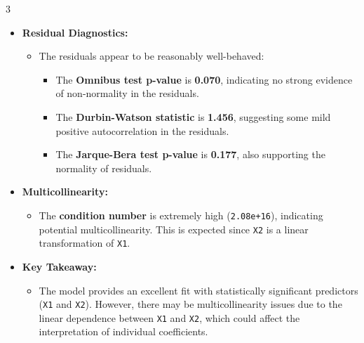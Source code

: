 \documentclass[letterpaper, 10.5pt,landscape]{article}
\begin{document}
\begin{multicols*}{3}
\begin{itemize}[leftmargin=0.4cm]
    \item \textbf{Residual Diagnostics:}
    \vspace{-2pt}
    \begin{itemize}[leftmargin=0.4cm]
        \vspace{-2pt}
        \item The residuals appear to be reasonably well-behaved:
        \vspace{-2pt}
        \begin{itemize}[leftmargin=0.4cm]
            \vspace{-2pt}
            \item The \textbf{Omnibus test p-value} is \textbf{0.070}, indicating no strong evidence of non-normality in the residuals.
            \vspace{-2pt}
            \item The \textbf{Durbin-Watson statistic} is \textbf{1.456}, suggesting some mild positive autocorrelation in the residuals.
            \vspace{-2pt}
            \item The \textbf{Jarque-Bera test p-value} is \textbf{0.177}, also supporting the normality of residuals.
            \vspace{-2pt}
        \end{itemize}
        \vspace{-2pt}
    \end{itemize}

    \item \textbf{Multicollinearity:}
    \vspace{-2pt}
    \begin{itemize}[leftmargin=0.4cm]
        \vspace{-2pt}
        \item The \textbf{condition number} is extremely high (\texttt{2.08e+16}), indicating potential multicollinearity. This is expected since \texttt{X2} is a linear transformation of \texttt{X1}.
        \vspace{-2pt}
    \end{itemize}

    \item \textbf{Key Takeaway:}
    \vspace{-2pt}
    \begin{itemize}[leftmargin=0.4cm]
        \vspace{-2pt}
        \item The model provides an excellent fit with statistically significant predictors (\texttt{X1} and \texttt{X2}). However, there may be multicollinearity issues due to the linear dependence between \texttt{X1} and \texttt{X2}, which could affect the interpretation of individual coefficients.
        \vspace{-2pt}
    \end{itemize}
    \vspace{-2pt}
\end{itemize}









\end{multicols*}
\end{document}
